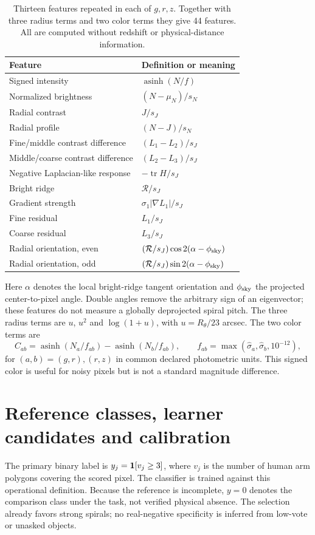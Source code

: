 \documentclass[10pt]{article}
\begin{document}
\begin{table}[htb]
\centering\small
\caption{Thirteen features repeated in each of $g,r,z$. Together with three
radius terms and two color terms they give 44 features. All are computed
without redshift or physical-distance information.}
\begin{tabular}{p{.32\linewidth}p{.59\linewidth}}
\toprule
Feature & Definition or meaning\\
\midrule
Signed intensity & $\operatorname{asinh}(N/f)$\\
Normalized brightness & $(N-\mu_N)/s_N$\\
Radial contrast & $J/s_J$\\
Radial profile & $(N-J)/s_N$\\
Fine/middle contrast difference & $(L_1-L_2)/s_J$\\
Middle/coarse contrast difference & $(L_2-L_3)/s_J$\\
Negative Laplacian-like response & $-\operatorname{tr}H/s_J$\\
Bright ridge & $\mathcal R/s_J$\\
Gradient strength & $\sigma_1|\nabla L_1|/s_J$\\
Fine residual & $L_1/s_J$\\
Coarse residual & $L_3/s_J$\\
Radial orientation, even & $(\mathcal R/s_J)\cos 2(\alpha-\phi_{\rm sky})$\\
Radial orientation, odd & $(\mathcal R/s_J)\sin 2(\alpha-\phi_{\rm sky})$\\
\bottomrule
\end{tabular}
\end{table}

Here $\alpha$ denotes the local bright-ridge tangent orientation and
$\phi_{\rm sky}$ the projected center-to-pixel angle. Double angles remove the
arbitrary sign of an eigenvector; these features do not measure a globally
deprojected spiral pitch. The three radius terms are $u$, $u^2$ and
$\log(1+u)$, with $u=R_\theta/23$ arcsec. The two color terms are
\begin{equation}
 C_{ab}=\operatorname{asinh}(N_a/f_{ab})-
 \operatorname{asinh}(N_b/f_{ab}),\qquad
 f_{ab}=\max(\widehat\sigma_a,\widehat\sigma_b,10^{-12}),
\end{equation}
for $(a,b)=(g,r),(r,z)$ in common declared photometric units. This signed
color is useful for noisy pixels but is not a standard magnitude difference.

\section{Reference classes, learner candidates and calibration}
The primary binary label is $y_j=\mathbf{1}[v_j\geq3]$, where $v_j$ is the number
of human arm polygons covering the scored pixel. The classifier is trained
against this operational definition. Because the reference is incomplete,
$y=0$ denotes the comparison class under the task, not verified physical
absence. The selection already favors strong spirals; no real-negative
specificity is inferred from low-vote or unasked objects.
\end{document}
